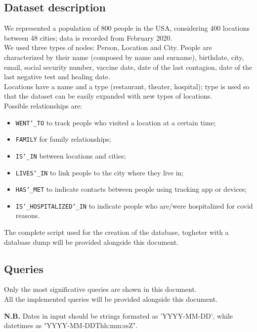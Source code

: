 \documentclass[12pt, a4paper]{article}
\begin{document}
\subsection{Dataset description}

We represented a population of 800 people in the USA, considering 400 locations
between 48 cities; data is recorded from February 2020.  \\ 
We used three types of nodes: Person, Location and City. 
People are characterized by their name (composed by name and surname), 
birthdate, city, email, social security number, vaccine date, date of the last 
contagion, date of the last negative test and healing date. \\
Locations have a name and a type (restaurant, theater, hospital); 
type is used so that the dataset can be easily expanded with new types of 
locations. \\
Possible relationships are: 
\begin{itemize}
    \item \texttt{WENT\char`_TO} to track people who visited a location at a 
        certain time;
	\item \texttt{FAMILY} for family relationships;
	\item \texttt{IS\char`_IN} between locations and cities;
	\item \texttt{LIVES\char`_IN} to link people to the city where they live in;
    \item \texttt{HAS\char`_MET} to indicate contacts between people using 
        tracking app or devices;
    \item \texttt{IS\char`_HOSPITALIZED\char`_IN} to indicate people who 
        are/were hospitalized for covid reasons.
\end{itemize}

\noindent %
The complete script used for the creation of the database, togheter with a 
database dump will be provided alongside this document.

\subsection{Queries}

Only the most significative queries are shown in this document. \\
All the implemented queries will be provided alongside this document. \par
\textbf{N.B.} Dates in input should be strings formated as 'YYYY-MM-DD', 
while datetimes as "YYYY-MM-DDThh:mm:ssZ".
\end{document}
